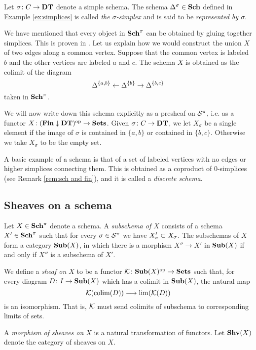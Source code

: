 \documentclass{amsart}
\def\DT{{\bf DT}}
\def\Sch{{\bf Sch}}
\def\Fin{{\bf Fin}}
\def\Sub{{\bf Sub}}
\begin{document}
\begin{definition}\label{def:simplex}

Let $\sigma\taking C\to\DT$ denote a simple schema.  The schema $\Delta^\sigma\in\Sch$ defined in Example \ref{ex:simplices} is called {\em the $\sigma$-simplex} and is said to be {\em represented by $\sigma$}.

\end{definition}

\begin{example}

We have mentioned that every object in $\Sch^\pi$ can be obtained by gluing together simplices.  This is proven in \cite[2.15.6]{Bor1}.  Let us explain how we would construct the union $X$ of two edges along a common vertex.  Suppose that the common vertex is labeled $b$ and the other vertices are labeled $a$ and $c$.  The schema $X$ is obtained as the colimit of the diagram $$\Delta^{\{a,b\}}\from\Delta^{\{b\}}\to\Delta^{\{b,c\}}$$ taken in $\Sch^\pi$.

We will now write down this schema explicitly as a presheaf on $\mcS^\pi$, i.e. as a functor $X\taking(\Fin\down\DT)\op\to\Sets$.  Given $\sigma\taking C\to\DT$, we let $X_\sigma$ be a single element if the image of $\sigma$ is contained in $\{a,b\}$ or contained in $\{b,c\}$.  Otherwise we take $X_\sigma$ to be the empty set.

\end{example}

\begin{example}\label{ex:discrete}

A basic example of a schema is that of a set of labeled vertices with no edges or higher simplices connecting them.  This is obtained as a coproduct of $0$-simplices (see Remark \ref{rem:sch and fin}), and it is called a {\em discrete schema}.  

\end{example}

\subsection{Sheaves on a schema}

\begin{definition}

Let $X\in\Sch^\pi$ denote a schema.  A {\em subschema of $X$} consists of a schema $X'\in\Sch^\pi$ such that for every $\sigma\in\mcS^\pi$ we have $X'_\sigma\ss X_\sigma$.  The subschemas of $X$ form a category $\Sub(X)$, in which there is a morphism $X''\to X'$ in $\Sub(X)$ if and only if $X''$ is a subschema of $X'$.  

We define a {\em sheaf on $X$} to be a functor $\mcK\taking\Sub(X)\op\to\Sets$ such that, for every diagram $D\taking I\to\Sub(X)$ which has a colimit in $\Sub(X)$, the natural map $$\mcK(\colim(D))\too\lim(\mcK(D))$$ is an isomorphism.  That is, $\mcK$ must send colimits of subschema to corresponding limits of sets.

A {\em morphism of sheaves on $X$} is a natural transformation of functors.  Let $\Shv(X)$ denote the category of sheaves on $X$.

\end{definition}
\end{document}
